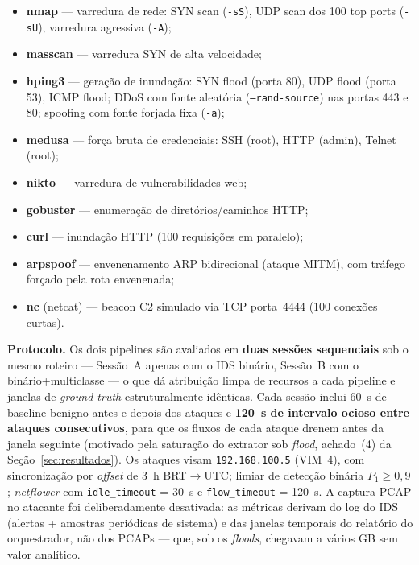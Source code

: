 \documentclass[12pt]{article}
\begin{document}
\begin{itemize}
  \item \textbf{nmap} — varredura de rede: SYN scan (\texttt{-sS}), UDP scan
    dos 100 top ports (\texttt{-sU}), varredura agressiva (\texttt{-A});
  \item \textbf{masscan} — varredura SYN de alta velocidade;
  \item \textbf{hping3} — geração de inundação: SYN flood (porta 80), UDP flood
    (porta 53), ICMP flood; DDoS com fonte aleatória (\texttt{--rand-source})
    nas portas 443 e 80; spoofing com fonte forjada fixa (\texttt{-a});
  \item \textbf{medusa} — força bruta de credenciais: SSH (root), HTTP (admin),
    Telnet (root);
  \item \textbf{nikto} — varredura de vulnerabilidades web;
  \item \textbf{gobuster} — enumeração de diretórios/caminhos HTTP;
  \item \textbf{curl} — inundação HTTP (100 requisições em paralelo);
  \item \textbf{arpspoof} — envenenamento ARP bidirecional (ataque MITM), com
    tráfego forçado pela rota envenenada;
  \item \textbf{nc} (netcat) — beacon C2 simulado via TCP porta~4444
    (100 conexões curtas).
\end{itemize}

\textbf{Protocolo.} Os dois pipelines são avaliados em \textbf{duas sessões
sequenciais} sob o mesmo roteiro — Sessão~A apenas com o IDS binário, Sessão~B
com o binário+multiclasse — o que dá atribuição limpa de recursos a cada pipeline
e janelas de \textit{ground truth} estruturalmente idênticas. Cada sessão inclui
60~s de baseline benigno antes e depois dos ataques e \textbf{120~s de intervalo
ocioso entre ataques consecutivos}, para que os fluxos de cada ataque drenem
antes da janela seguinte (motivado pela saturação do extrator sob \textit{flood},
achado~(4) da Seção~\ref{sec:resultados}). Os ataques visam \texttt{192.168.100.5}
(VIM~4), com sincronização por \textit{offset} de 3~h BRT$\rightarrow$UTC; limiar
de detecção binária $P_1 \geq 0{,}9$; \textit{netflower} com \texttt{idle\_timeout}
= 30~s e \texttt{flow\_timeout} = 120~s. A captura PCAP no atacante foi
deliberadamente desativada: as métricas derivam do log do IDS (alertas + amostras
periódicas de sistema) e das janelas temporais do relatório do orquestrador, não
dos PCAPs — que, sob os \textit{floods}, chegavam a vários GB sem valor analítico.
\end{document}
